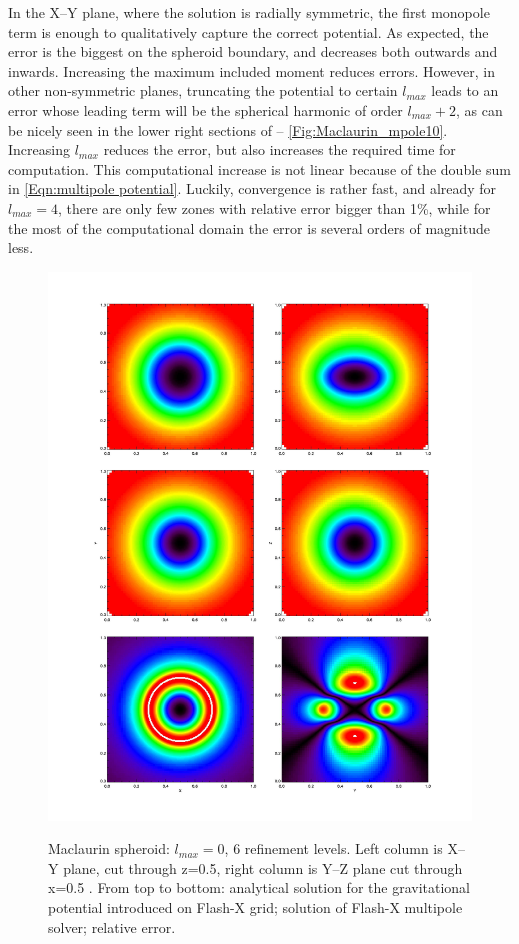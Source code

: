 In the X--Y plane, where the solution is radially symmetric, the first monopole term is enough to qualitatively capture the correct
potential. As expected, the error is the biggest on the spheroid boundary, 
and decreases both outwards and inwards. Increasing the maximum included moment reduces errors.
However, in other non-symmetric planes, 
truncating the potential to certain $l_{max}$ leads to an error whose leading term will be 
the spherical harmonic of order $l_{max}+2$, as can be nicely seen in the lower right sections of 
 -- \ref{Fig:Maclaurin_mpole10}.
Increasing $l_{max}$ reduces the error, but also increases the required time for computation.
This computational increase is not 
linear because of the double sum in \eqref{Eqn:multipole potential}. 
Luckily, convergence is rather fast, and already 
for $l_{max} = 4$, there are only few zones with relative error bigger than 1\%, while for the most of the computational domain the error is several orders of magnitude less. 

\begin{figure}
\begin{center}
{\leavevmode\includegraphics[width=140mm]{Maclaurin_mpole0}}
\end{center}
\caption{Maclaurin spheroid: $l_{max} = 0$, 6 refinement levels. Left column is X--Y plane, 
                cut through z=0.5, right column is Y--Z plane cut through x=0.5 .
                From top to bottom: analytical solution for the gravitational potential introduced on 
                Flash-X grid; solution of Flash-X multipole solver; relative error.}
\label{Fig:Maclaurin_mpole0}
\end{figure}


